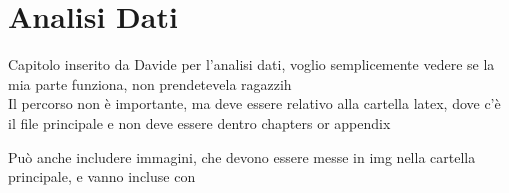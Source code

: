 \section{Analisi Dati}
Capitolo inserito da Davide per l'analisi dati, voglio semplicemente vedere se la mia parte funziona, non prendetevela ragazzih\\



Il percorso non è importante, ma deve essere relativo alla cartella latex, dove c'è il file principale e non deve essere dentro chapters or appendix


Può anche includere immagini, che devono essere messe in img nella cartella principale, e vanno incluse con

 
